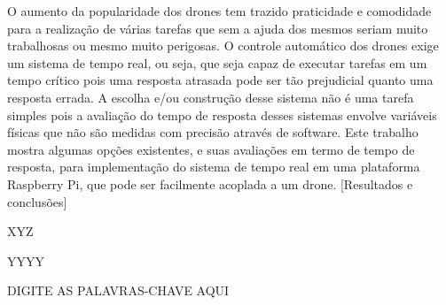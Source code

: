 \documentclass[bsc, classic, a4paper]{ufbathesis}
\begin{document}
\resumo
O aumento da popularidade dos drones tem trazido praticidade e comodidade para a realização de várias tarefas que sem a ajuda dos mesmos seriam muito trabalhosas ou mesmo muito perigosas. O controle automático dos drones exige um sistema de tempo real, ou seja, que seja capaz de executar tarefas em um tempo crítico pois uma resposta atrasada pode ser tão prejudicial quanto uma resposta errada. A escolha e/ou construção desse sistema não é uma tarefa simples pois a avaliação do tempo de resposta desses sistemas envolve variáveis físicas que não são medidas com precisão através de software. Este trabalho mostra algumas opções existentes, e suas avaliações em termo de tempo de resposta, para implementação do sistema de tempo real em uma plataforma Raspberry Pi, que pode ser facilmente acoplada a um drone. [Resultados e conclusões]

\begin{keywords}
XYZ
\end{keywords}

\abstract
YYYY
\begin{keywords}
DIGITE AS PALAVRAS-CHAVE AQUI
\end{keywords}

\tableofcontents

\listoffigures

\listoftables

\mainmatter

% 
% 
% 
%

\end{document}
